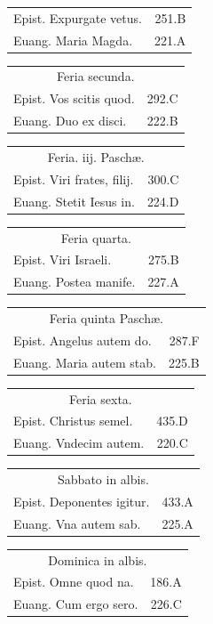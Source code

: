 \documentclass[a5paper,10pt]{book}
\def\ae{æ}
\begin{document}
\begin{multicols}{2}
\begin{tabular}{l r}
Epist. Expurgate vetus. & 251.B\\
Euang. Maria Magda. & 221.A\\
\end{tabular}
\begin{tabular}{l r}
\multicolumn{2}{c}{\color{red} Feria secunda.}\\
Epist. Vos scitis quod. & 292.C\\
Euang. Duo ex disci. & 222.B\\
\end{tabular}
\begin{tabular}{l r}
\multicolumn{2}{c}{\color{red} Feria. iij. Pasch\ae .}\\
Epist. Viri frates, filij. & 300.C\\
Euang. Stetit Iesus in. & 224.D\\
\end{tabular}
\begin{tabular}{l r}
\multicolumn{2}{c}{\color{red} Feria quarta.}\\
Epist. Viri Israeli. & 275.B\\
Euang. Postea manife. & 227.A\\
\end{tabular}
\begin{tabular}{l r}
\multicolumn{2}{c}{\color{red} Feria quinta Pasch\ae .}\\
Epist. Angelus autem do. & 287.F\\
Euang. Maria autem stab. & 225.B\\
\end{tabular}
\begin{tabular}{l r}
\multicolumn{2}{c}{\color{red} Feria sexta.}\\
Epist. Christus semel. & 435.D\\
Euang. Vndecim autem. & 220.C\\
\end{tabular}
\begin{tabular}{l r}
\multicolumn{2}{c}{\color{red} Sabbato in albis.}\\
Epist. Deponentes igitur. & 433.A\\
Euang. Vna autem sab. & 225.A\\
\end{tabular}
\begin{tabular}{l r}
\multicolumn{2}{c}{\color{red} Dominica in albis.}\\
Epist. Omne quod na. & 186.A\\
Euang. Cum ergo sero. & 226.C\\

\end{tabular}
\end{multicols}
\end{document}
